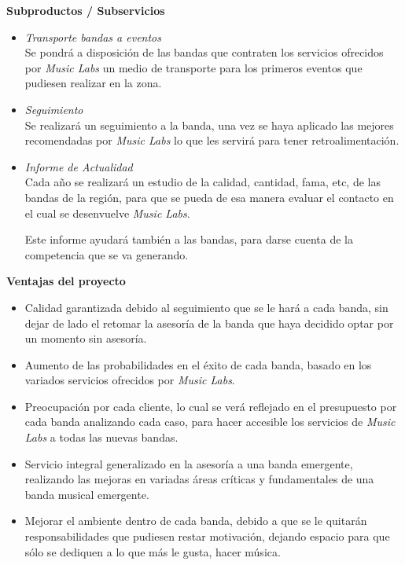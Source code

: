 {\bf Subproductos / Subservicios}

\begin{itemize}
	\item \emph{Transporte bandas a eventos}\\

      Se pondrá a disposición de las bandas que contraten los servicios
      ofrecidos por \emph{Music Labs} un medio de transporte para los primeros
      eventos que pudiesen realizar en la zona.
	\item \emph{Seguimiento}\\

      Se realizará un seguimiento a la banda, una vez se haya aplicado
      las mejores recomendadas por \emph{Music Labs} lo que les servirá
      para tener retroalimentación.
	\item \emph{Informe de Actualidad}\\

      Cada año se realizará un estudio de la calidad, cantidad, fama, etc,
      de las bandas de la región, para que se pueda de esa manera evaluar
      el contacto en el cual se desenvuelve \emph{Music Labs}.

      Este informe ayudará también a las bandas, para darse cuenta
      de la competencia que se va generando.
\end{itemize}


{\bf Ventajas del proyecto}

\begin{itemize}
	\item Calidad garantizada debido al seguimiento que se le hará a cada banda, sin dejar de lado el
		retomar la asesoría de la banda que haya decidido optar por un momento sin asesoría.
	\item Aumento de las probabilidades en el éxito de cada banda, basado en los variados servicios
		ofrecidos por \emph{Music Labs}. 
	\item Preocupación por cada cliente, lo cual se verá reflejado en el presupuesto por cada banda
		analizando cada caso, para hacer accesible los servicios de \emph{Music Labs} a todas
		las nuevas bandas.
	\item Servicio integral generalizado en la asesoría a una banda emergente, realizando las mejoras
		en variadas áreas críticas y fundamentales de una banda musical emergente.
	\item Mejorar el ambiente dentro de cada banda, debido a que se le quitarán responsabilidades
		que pudiesen restar motivación, dejando espacio para que sólo se dediquen a lo que más
		le gusta, hacer música. 
\end{itemize}

